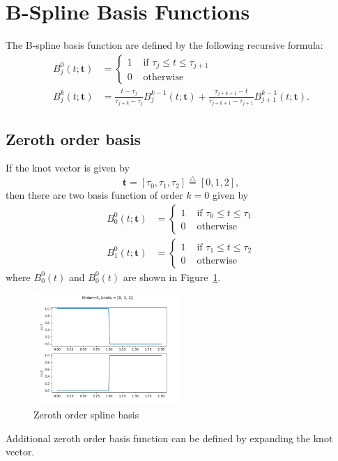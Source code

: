 \documentclass{article}
\newcommand{\defeq}{\stackrel{\triangle}{=}}
\begin{document}
\section{B-Spline Basis Functions}
\label{sec:b-spline-basis-functions}

The B-spline basis function are defined by the following recursive formula:
\begin{align*}
B_j^0(t; \mathbf{t}) &= \begin{cases} 1 & \text{~if~} \tau_j \leq t \leq \tau_{j+1} \\ 
 									 0 & \text{~otherwise} 
 					   \end{cases} \\	
B_j^k(t; \mathbf{t}) &= \frac{t-\tau_j}{\tau_{j+k}-
\tau_j} B_j^{k-1}(t; \mathbf{t}) + \frac{\tau_{j+k+1}-t}{\tau_{j+k+1}-\tau_{j+1}} B_{j+1}^{k-1}(t; \mathbf{t}).
\end{align*}

\subsection{Zeroth order basis}

If the knot vector is given by
\[
\mathbf{t} = [\tau_0, \tau_1, \tau_2] \defeq [0, 1, 2],
\]
then there are two basis function of order $k=0$ given by
\begin{align*}
B_0^0(t; \mathbf{t}) &= \begin{cases} 1 & \text{~if~} \tau_0 \leq t \leq \tau_1 \\ 
 									 0 & \text{~otherwise} 
 			\end{cases}
\\ 
B_1^0(t; \mathbf{t}) &= \begin{cases} 1 & \text{~if~} \tau_1 \leq t \leq \tau_2 \\ 
 									 0 & \text{~otherwise}
 			\end{cases}
\end{align*}
where $B_0^0(t)$ and $B_0^0(t)$ are shown in Figure~\ref{fig:spline_basis_0}.
\begin{figure}[hbt]
  \centering\includegraphics[width=0.5\textwidth]{./figures/spline_basis_0}
  \caption{Zeroth order spline basis}
  \label{fig:spline_basis_0}  
\end{figure}
Additional zeroth order basis function can be defined by expanding the knot vector.
\end{document}
